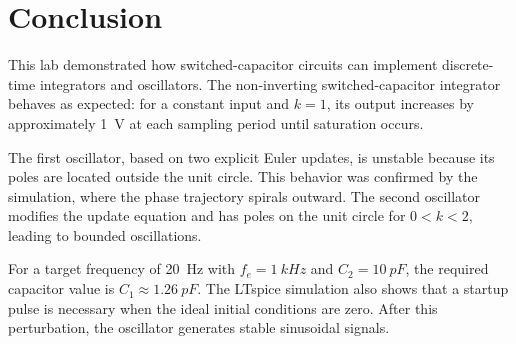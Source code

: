 \documentclass[11pt,a4paper]{article}
\begin{document}
\section{Conclusion}

This lab demonstrated how switched-capacitor circuits can implement discrete-time integrators and oscillators. The non-inverting switched-capacitor integrator behaves as expected: for a constant input and $k=1$, its output increases by approximately \SI{1}{V} at each sampling period until saturation occurs.

The first oscillator, based on two explicit Euler updates, is unstable because its poles are located outside the unit circle. This behavior was confirmed by the simulation, where the phase trajectory spirals outward. The second oscillator modifies the update equation and has poles on the unit circle for $0<k<2$, leading to bounded oscillations.

For a target frequency of \SI{20}{Hz} with $f_e=\SI{1}{kHz}$ and $C_2=\SI{10}{pF}$, the required capacitor value is $C_1\approx\SI{1.26}{pF}$. The LTspice simulation also shows that a startup pulse is necessary when the ideal initial conditions are zero. After this perturbation, the oscillator generates stable sinusoidal signals.
\end{document}
